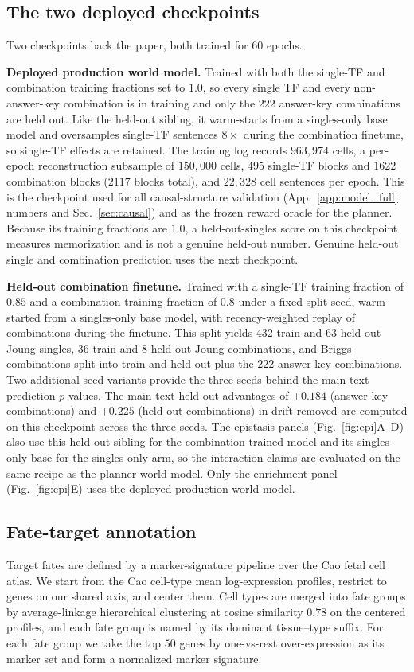 \subsection{The two deployed checkpoints}
Two checkpoints back the paper, both trained for $60$ epochs.

\textbf{Deployed production world model.} Trained with both the single-TF and combination
training fractions set to $1.0$, so every single TF and every non-answer-key combination is
in training and only the $222$ answer-key combinations are held out. Like the held-out
sibling, it warm-starts from a singles-only base model and oversamples single-TF sentences
$8\times$ during the combination finetune, so single-TF effects are retained. The training
log records $963{,}974$ cells, a per-epoch reconstruction subsample of $150{,}000$ cells,
$495$ single-TF blocks and $1622$ combination blocks ($2117$ blocks total), and $22{,}328$
cell sentences per epoch. This is the checkpoint used for all causal-structure validation
(App.~\ref{app:model_full} numbers and Sec.~\ref{sec:causal}) and as the frozen reward
oracle for the planner. Because its training fractions are $1.0$, a held-out-singles score
on this checkpoint measures memorization and is not a genuine held-out number. Genuine
held-out single and combination prediction uses the next checkpoint.

\textbf{Held-out combination finetune.} Trained with a single-TF training fraction of
$0.85$ and a combination training fraction of $0.8$ under a fixed split seed, warm-started
from a singles-only base model, with recency-weighted replay of combinations during the
finetune. This split yields $432$ train and $63$ held-out Joung singles, $36$ train and $8$
held-out Joung combinations, and Briggs combinations split into train and held-out plus the
$222$ answer-key combinations. Two additional seed variants provide the three seeds behind
the main-text prediction $p$-values. The main-text held-out advantages of $+0.184$
(answer-key combinations) and $+0.225$ (held-out combinations) in drift-removed
\PearsonDEG are computed on this checkpoint across the three seeds. The epistasis
panels (Fig.~\ref{fig:epi}A--D) also use this held-out sibling for the combination-trained
model and its singles-only base for the singles-only arm, so the interaction claims are
evaluated on the same recipe as the planner world model. Only the enrichment panel
(Fig.~\ref{fig:epi}E) uses the deployed production world model.

\subsection{Fate-target annotation}\label{app:fate}
Target fates are defined by a marker-signature pipeline over the Cao fetal cell atlas. We
start from the Cao cell-type mean log-expression profiles, restrict to genes on our shared
axis, and center them. Cell types are merged into fate groups by average-linkage
hierarchical clustering at cosine similarity $0.78$ on the centered profiles, and each fate
group is named by its dominant tissue--type suffix. For each fate group we take the top
$50$ genes by one-vs-rest over-expression as its marker set and form a normalized marker
signature.

